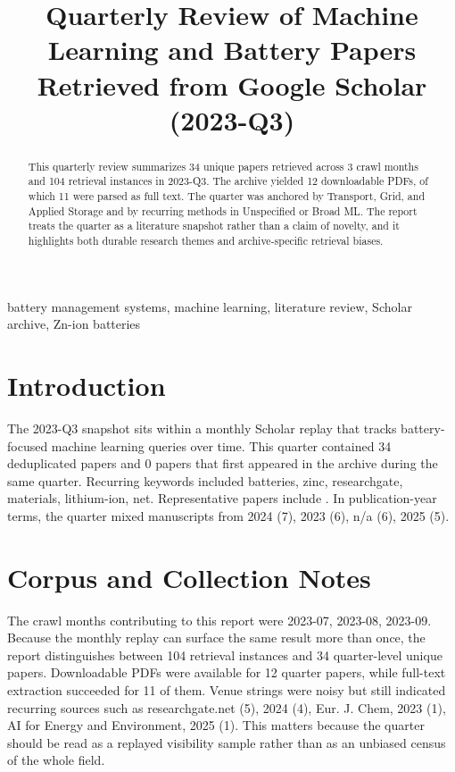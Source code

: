 \documentclass[conference]{IEEEtran}
\begin{document}
\title{ Quarterly Review of Machine Learning and Battery Papers Retrieved from Google Scholar (2023-Q3) }

\author{
}

\maketitle

\begin{abstract}
This quarterly review summarizes 34 unique papers retrieved across 3 crawl months and 104 retrieval instances in 2023-Q3. The archive yielded 12 downloadable PDFs, of which 11 were parsed as full text. The quarter was anchored by Transport, Grid, and Applied Storage and by recurring methods in Unspecified or Broad ML. The report treats the quarter as a literature snapshot rather than a claim of novelty, and it highlights both durable research themes and archive-specific retrieval biases.
\end{abstract}

\begin{IEEEkeywords}
battery management systems, machine learning, literature review, Scholar archive, Zn-ion batteries
\end{IEEEkeywords}

\section{Introduction}
The 2023-Q3 snapshot sits within a monthly Scholar replay that tracks battery-focused machine learning queries over time. This quarter contained 34 deduplicated papers and 0 papers that first appeared in the archive during the same quarter. Recurring keywords included batteries, zinc, researchgate, materials, lithium-ion, net. Representative papers include \cite{machinelearningdriven2025,recentadvancesin2025,aphysicsinspired2023,datadrivenapproaches2024}. In publication-year terms, the quarter mixed manuscripts from 2024 (7), 2023 (6), n/a (6), 2025 (5).

\section{Corpus and Collection Notes}
The crawl months contributing to this report were 2023-07, 2023-08, 2023-09. Because the monthly replay can surface the same result more than once, the report distinguishes between 104 retrieval instances and 34 quarter-level unique papers. Downloadable PDFs were available for 12 quarter papers, while full-text extraction succeeded for 11 of them. Venue strings were noisy but still indicated recurring sources such as researchgate.net (5), 2024 (4), Eur. J. Chem, 2023 (1), AI for Energy and Environment, 2025 (1). This matters because the quarter should be read as a replayed visibility sample rather than as an unbiased census of the whole field.
\end{document}
